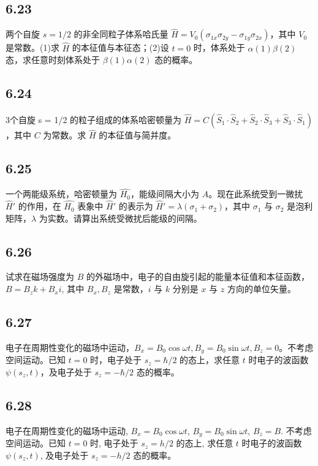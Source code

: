 \subsection{6.23}
两个自旋 $s=1/2$ 的非全同粒子体系哈氏量 $\hat{H} = V_0 (\sigma_{1x}\sigma_{2y}-\sigma_{1y}\sigma_{2x})$，其中 $V_0$ 是常数。(1)求 $\hat{H}$ 的本征值与本征态；(2)设 $t=0$ 时，体系处于 $\alpha(1)\beta(2)$ 态，求任意时刻体系处于 $\beta(1)\alpha(2)$ 态的概率。

\subsection{6.24}
3个自旋 s = 1/2 的粒子组成的体系哈密顿量为 $\hat{H} = C(\hat{S}_1 \cdot \hat{S}_2 + \hat{S}_2 \cdot \hat{S}_3 + \hat{S}_3 \cdot \hat{S}_1)$，其中 $C$ 为常数。求 $\hat{H}$ 的本征值与简并度。

\subsection{6.25}
一个两能级系统，哈密顿量为 $\hat{H_0}$，能级间隔大小为 $A$。现在此系统受到一微扰 $\hat{H}'$ 的作用，在 $\hat{H_0}$ 表象中 $\hat{H}'$ 的表示为 $\hat{H}' = \lambda (\sigma_1 + \sigma_2)$，其中 $\sigma_1$ 与 $\sigma_2$ 是泡利矩阵，$\lambda$ 为实数。请算出系统受微扰后能级的间隔。

\subsection{6.26}
试求在磁场强度为 $B$ 的外磁场中，电子的自由旋引起的能量本征值和本征函数，$B = B_z k + B_x i$, 其中 $B_x, B_z$ 是常数，$i$ 与 $k$ 分别是 $x$ 与 $z$ 方向的单位矢量。

\subsection{6.27}
电子在周期性变化的磁场中运动，$B_x = B_0 \cos \omega t, B_y = B_0 \sin \omega t, B_z = 0$。不考虑空间运动。已知 $t = 0$ 时，电子处于 $s_z = \hbar / 2$ 的态上，求任意 $t$ 时电子的波函数 $\psi(s_z, t)$，及电子处于 $s_z = -\hbar / 2$ 态的概率。

\subsection{6.28}
电子在周期性变化的磁场中运动, $B_x = B_0 \cos \omega t$, $B_y = B_0 \sin \omega t$, $B_z = B$. 不考虑空间运动。已知 $t = 0$ 时, 电子处于 $s_z = h/2$ 的态上, 求任意 $t$ 时电子的波函数 $\psi(s_z,t)$, 及电子处于 $s_z = -h/2$ 态的概率。

